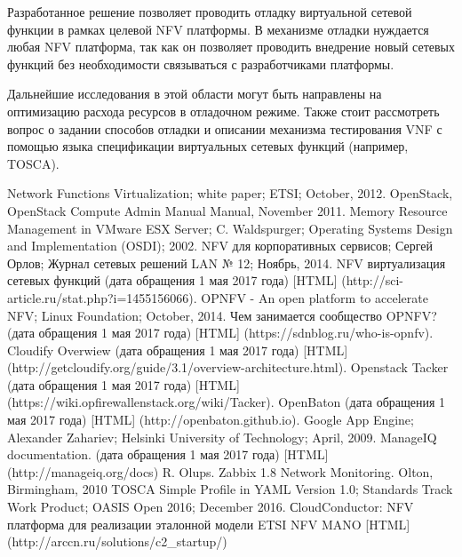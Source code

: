 \documentclass[oneside,final,14pt,a4paper]{extreport}
\begin{document}
Разработанное решение позволяет проводить отладку виртуальной сетевой функции в рамках целевой NFV платформы. В механизме отладки нуждается любая NFV платформа, так как он позволяет проводить внедрение новый сетевых функций без необходимости связываться с разработчиками платформы.

Дальнейшие исследования в этой области могут быть направлены на оптимизацию расхода ресурсов в отладочном режиме. Также стоит рассмотреть вопрос о задании способов отладки и описании механизма тестирования VNF с помощью языка спецификации виртуальных сетевых функций (например, TOSCA).





\begin{thebibliography}{00}
 Network Functions Virtualization; white paper; ETSI; October, 2012.
 OpenStack, OpenStack Compute Admin Manual Manual, November 2011.
 Memory Resource Management in VMware ESX Server; C. Waldspurger; Operating Systems Design and Implementation (OSDI); 2002.
 NFV для корпоративных сервисов; Сергей Орлов; Журнал сетевых решений LAN № 12; Ноябрь, 2014.
 NFV виртуализация сетевых функций (дата обращения 1 мая 2017 года) [HTML] (http://sci-article.ru/stat.php?i=1455156066).
 OPNFV - An open platform to accelerate NFV; Linux Foundation; October, 2014.
 Чем занимается сообщество OPNFV? (дата обращения 1 мая 2017 года) [HTML] (https://sdnblog.ru/who-is-opnfv).
 Cloudify Overwiew (дата обращения 1 мая 2017 года) [HTML] (http://getcloudify.org/guide/3.1/overview-architecture.html).
 Openstack Tacker (дата обращения 1 мая 2017 года) [HTML] (https://wiki.opfirewallenstack.org/wiki/Tacker).
 OpenBaton (дата обращения 1 мая 2017 года) [HTML] (http://openbaton.github.io).
 Google App Engine; Alexander Zahariev; Helsinki University of Technology;  April, 2009.
 ManageIQ documentation. (дата обращения 1 мая 2017 года) [HTML] (http://manageiq.org/docs)
 R. Olups. Zabbix 1.8 Network Monitoring. Olton, Birmingham, 2010
 TOSCA Simple Profile in YAML Version 1.0; Standards Track Work Product; OASIS Open 2016; December 2016.
 СloudConductor: NFV платформа для реализации эталонной модели ETSI NFV MANO [HTML] (http://arccn.ru/solutions/c2\_startup/)

\end{thebibliography}
\end{document}
